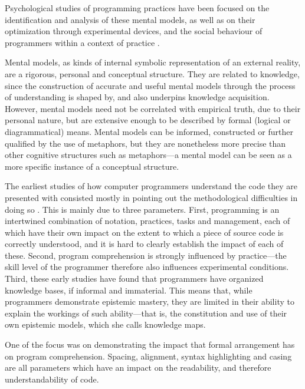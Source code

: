 Psychological studies of programming practices have been focused on the identification and analysis of these mental models, as well as on their optimization through experimental devices, and the social behaviour of programmers within a context of practice \citep{weinberg_psychology_1998}.

Mental models, as kinds of internal symbolic representation of an external reality, are a rigorous, personal and conceptual structure. They are related to knowledge, since the construction of accurate and useful mental models through the process of understanding is shaped by, and also underpins knowledge acquisition. However, mental models need not be correlated with empirical truth, due to their personal nature, but are extensive enough to be described by formal (logical or diagrammatical) means. Mental models can be informed, constructed or further qualified by the use of metaphors, but they are nonetheless more precise than other cognitive structures such as metaphors—a mental model can be seen as a more specific instance of a conceptual structure. %

The earliest studies of how computer programmers understand the code they are presented with consisted mostly in pointing out the methodological difficulties in doing so \citep{sheil_psychological_1981,shneiderman_measuring_1977}. This is mainly due to three parameters. First, programming is an intertwined combination of notation, practices, tasks and management, each of which have their own impact on the extent to which a piece of source code is correctly understood, and it is hard to clearly establish the impact of each of these. Second, program comprehension is strongly influenced by practice—the skill level of the programmer therefore also influences experimental conditions. Third, these early studies have found that programmers have organized knowledge bases, if informal and immaterial. This means that, while programmers demonstrate epistemic mastery, they are limited in their ability to explain the workings of such ability—that is, the constitution and use of their own epistemic models, which she calls knowledge maps. %

One of the focus was on demonstrating the impact that formal arrangement has on program comprehension\citep{oman_typographic_1990,oliveira_systematic_2022}. Spacing, alignment, syntax highlighting and casing are all parameters which have an impact on the readability, and therefore understandability of code.

